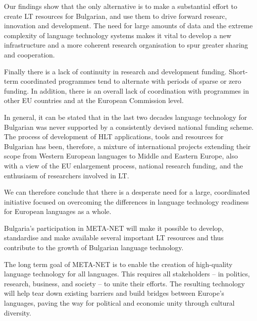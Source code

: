 \begin{multicols}{2}
  Our findings show that the only alternative is to make a substantial effort to create LT resources for Bulgarian, and use them to drive forward researc, innovation and development. The need for large amounts of data and the extreme complexity of language technology systems makes it vital to develop a new infrastructure and a more coherent research organisation to spur greater sharing and cooperation.

  Finally there is a lack of continuity in research and development funding. Short-term coordinated programmes tend to alternate with periods of sparse or zero funding. In addition, there is an overall lack of coordination with programmes in other EU countries and at the European Commission level.

  In general, it can be stated that in the last two decades language technology for Bulgarian was never supported by a consistently devised national funding scheme. The process of development of HLT applications, tools and resources for Bulgarian has been, therefore, a mixture of international projects extending their scope from Western European languages to Middle and Eastern Europe, also with a view of the EU enlargement process, national research funding, and the enthusiasm of researchers involved in LT.
  \columnbreak

  We can therefore conclude that there is a desperate need for a large, coordinated initiative focused on overcoming the differences in language technology readiness for European languages as a whole. 

  Bulgaria’s participation in
  META-NET will make it possible to develop, standardise and make
  available several important LT resources and thus contribute to the
  growth of Bulgarian language technology.

  The long term goal of META-NET is to enable the creation of high-quality language technology for all languages. This requires all stakeholders -- in politics, research, business, and society -- to unite their efforts. The resulting technology will help tear down existing barriers and build bridges between Europe’s languages, paving the way for political and economic unity through cultural diversity. 
  \end{multicols}

  \clearpage

